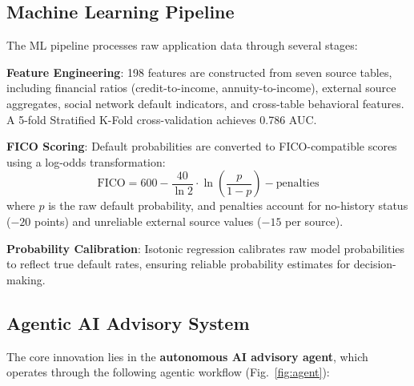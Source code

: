 \documentclass[12pt,a4paper]{article}
\begin{document}
\subsection{Machine Learning Pipeline}

The ML pipeline processes raw application data through several stages:

\textbf{Feature Engineering}: 198 features are constructed from seven source tables, including financial ratios (credit-to-income, annuity-to-income), external source aggregates, social network default indicators, and cross-table behavioral features. A 5-fold Stratified K-Fold cross-validation achieves 0.786 AUC.

\textbf{FICO Scoring}: Default probabilities are converted to FICO-compatible scores using a log-odds transformation:
\begin{equation}
\text{FICO} = 600 - \frac{40}{\ln 2} \cdot \ln\!\left(\frac{p}{1-p}\right) - \text{penalties}
\label{eq:fico}
\end{equation}
where $p$ is the raw default probability, and penalties account for no-history status ($-20$ points) and unreliable external source values ($-15$ per source).

\textbf{Probability Calibration}: Isotonic regression calibrates raw model probabilities to reflect true default rates, ensuring reliable probability estimates for decision-making.

\subsection{Agentic AI Advisory System}

The core innovation lies in the \textbf{autonomous AI advisory agent}, which operates through the following agentic workflow (Fig.~\ref{fig:agent}):
\end{document}
